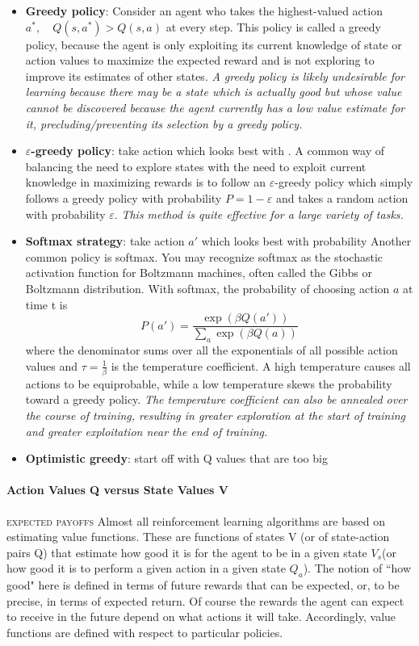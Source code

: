 \documentclass[11pt]{article}
\begin{document}
\begin{itemize}
	\item \textbf{Greedy policy}: Consider an agent who takes the highest-valued action $a^*,\quad Q(s,a^*)>Q(s,a)$ at every step. This policy is called a greedy policy, because the agent is only exploiting its current knowledge of state or action values to maximize the expected reward and is not exploring to improve its estimates of other states. \textit{A greedy policy is likely undesirable for learning because there may be a state which is actually good but whose value cannot be discovered because the agent currently has a low value estimate for it, precluding/preventing its selection by a greedy policy.}
	\item \textbf{$\varepsilon$-greedy policy}: take action which looks best with . A common way of balancing the need to explore states with the need to exploit current knowledge in maximizing rewards is to follow an $\varepsilon$-greedy policy which simply follows a greedy policy with probability $P = 1-\varepsilon$ and takes a random action with probability $\varepsilon$. \textit{This method is quite effective for a large variety of tasks.} 
	\item \textbf{Softmax strategy}: take action $a'$ which looks best with probability 
	Another common policy is softmax. You may recognize softmax as the stochastic activation function for Boltzmann machines, often called the Gibbs or Boltzmann distribution. With softmax, the probability of choosing action $a$ at time t is 
	\[
	P(a') = \frac{\exp{(\beta Q(a'))}}{\sum_a \exp{(\beta Q(a))}}
	\]
	where the denominator sums over all the exponentials of all possible action values and $\tau=\frac{1}{\beta}$ is the temperature coefficient. A high temperature causes all actions to be equiprobable, while a low temperature skews the probability toward a greedy policy. \textit{The temperature coefficient can also be annealed over the course of training, resulting in greater exploration at the start of training and greater exploitation near the end of training.} 
	\item \textbf{Optimistic greedy}: start off with Q values that are too big
\end{itemize}

\paragraph{Action Values Q versus State Values V}
\textsc{expected payoffs}
Almost all reinforcement learning algorithms are based on estimating value functions. These are functions of states V (or of state-action pairs Q) that estimate how good it is for the agent to be in a given state $V_s$(or
how good it is to perform a given action in a given state $Q_a$). The notion of ``how good" here is defined in terms of future rewards that can be expected, or, to be precise, in terms of expected return. Of course the rewards the agent can expect to receive in the future depend on what actions it will take. Accordingly, value functions are defined with respect to particular policies.\\
\end{document}
